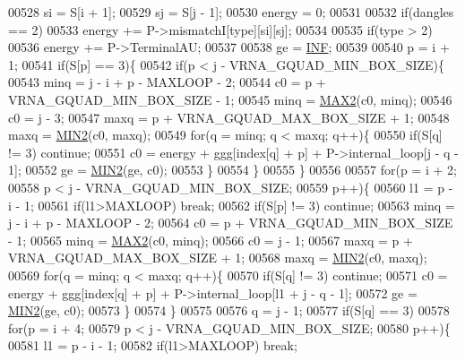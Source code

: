 \begin{DoxyCode}
00528   si      = S[i + 1];
00529   sj      = S[j - 1];
00530   energy  = 0;
00531 
00532   \textcolor{keywordflow}{if}(dangles == 2)
00533     energy += P->mismatchI[type][si][sj];
00534 
00535   \textcolor{keywordflow}{if}(type > 2)
00536     energy += P->TerminalAU;
00537 
00538   ge = \hyperlink{energy__const_8h_a12c2040f25d8e3a7b9e1c2024c618cb6}{INF};
00539 
00540   p = i + 1;
00541   \textcolor{keywordflow}{if}(S[p] == 3)\{
00542     \textcolor{keywordflow}{if}(p < j - VRNA\_GQUAD\_MIN\_BOX\_SIZE)\{
00543       minq  = j - i + p - MAXLOOP - 2;
00544       c0    = p + VRNA\_GQUAD\_MIN\_BOX\_SIZE - 1;
00545       minq  = \hyperlink{group__utils_gadd91367918fadbc8d585940d6206d6d2}{MAX2}(c0, minq);
00546       c0    = j - 3;
00547       maxq  = p + VRNA\_GQUAD\_MAX\_BOX\_SIZE + 1;
00548       maxq  = \hyperlink{group__utils_ga2dd4a927a7f937f43a90c144d79107d8}{MIN2}(c0, maxq);
00549       \textcolor{keywordflow}{for}(q = minq; q < maxq; q++)\{
00550         \textcolor{keywordflow}{if}(S[q] != 3) \textcolor{keywordflow}{continue};
00551         c0  = energy + ggg[index[q] + p] + P->internal\_loop[j - q - 1];
00552         ge  = \hyperlink{group__utils_ga2dd4a927a7f937f43a90c144d79107d8}{MIN2}(ge, c0);
00553       \}
00554     \}
00555   \}
00556 
00557   \textcolor{keywordflow}{for}(p = i + 2;
00558       p < j - VRNA\_GQUAD\_MIN\_BOX\_SIZE;
00559       p++)\{
00560     l1    = p - i - 1;
00561     \textcolor{keywordflow}{if}(l1>MAXLOOP) \textcolor{keywordflow}{break};
00562     \textcolor{keywordflow}{if}(S[p] != 3) \textcolor{keywordflow}{continue};
00563     minq  = j - i + p - MAXLOOP - 2;
00564     c0    = p + VRNA\_GQUAD\_MIN\_BOX\_SIZE - 1;
00565     minq  = \hyperlink{group__utils_gadd91367918fadbc8d585940d6206d6d2}{MAX2}(c0, minq);
00566     c0    = j - 1;
00567     maxq  = p + VRNA\_GQUAD\_MAX\_BOX\_SIZE + 1;
00568     maxq  = \hyperlink{group__utils_ga2dd4a927a7f937f43a90c144d79107d8}{MIN2}(c0, maxq);
00569     \textcolor{keywordflow}{for}(q = minq; q < maxq; q++)\{
00570       \textcolor{keywordflow}{if}(S[q] != 3) \textcolor{keywordflow}{continue};
00571       c0  = energy + ggg[index[q] + p] + P->internal\_loop[l1 + j - q - 1];
00572       ge   = \hyperlink{group__utils_ga2dd4a927a7f937f43a90c144d79107d8}{MIN2}(ge, c0);
00573     \}
00574   \}
00575 
00576   q = j - 1;
00577   \textcolor{keywordflow}{if}(S[q] == 3)
00578     \textcolor{keywordflow}{for}(p = i + 4;
00579         p < j - VRNA\_GQUAD\_MIN\_BOX\_SIZE;
00580         p++)\{
00581       l1    = p - i - 1;
00582       \textcolor{keywordflow}{if}(l1>MAXLOOP) \textcolor{keywordflow}{break};

\end{DoxyCode}
